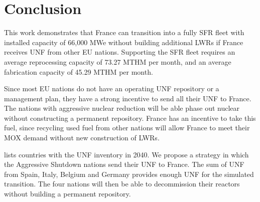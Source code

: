 \section{Conclusion}

This work demonstrates that France can transition into
a fully \gls{SFR} fleet with installed capacity of 66,000 \gls{MWe} without
building additional \glspl{LWR}
if France receives \gls{UNF} from other \gls{EU} nations.
Supporting the \gls{SFR} fleet requires an average 
reprocessing capacity of 73.27 \gls{MTHM} per month,
and an average fabrication capacity of 45.29 \gls{MTHM} per month.


Since most \gls{EU} nations do not have an operating \gls{UNF}
repository or a management plan, they have a strong incentive
to send all their \gls{UNF} to France. The nations
with aggressive nuclear reduction will be able phase out nuclear
without constructing a permanent repository. France has an
incentive to take this fuel, since recycling used fuel from
other nations will allow France to meet their MOX demand
without new construction of \glspl{LWR}.

 lists countries with the \gls{UNF} inventory
in 2040. We propose a strategy in which 
the Aggressive Shutdown nations send their \gls{UNF} to France.
The sum of \gls{UNF} from Spain, Italy, Belgium and Germany
provides enough \gls{UNF} for the simulated transition.
The four nations will then be able to decommission
their reactors without building a permanent repository. 

